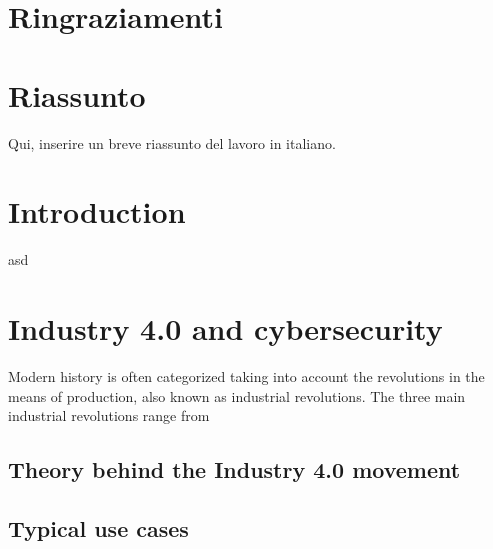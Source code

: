 \documentclass[a4paper, 12pt]{book}
\begin{document}
\pagestyle{empty}
\clearpage
\tableofcontents
\thispagestyle{empty}

\chapter{Ringraziamenti}


\chapter{Riassunto}

Qui, inserire un breve riassunto del lavoro in italiano.


\chapter{Introduction}
\pagestyle{fancy}
\fancyhf{}
\renewcommand{\headrulewidth}{2pt}
\fancyhead[EL]{\textbf{\textsf{\nouppercase\thepage}}}
\fancyhead[ER]{\textbf{\textsf{\nouppercase\leftmark}}}
\fancyhead[OR]{\textbf{\textsf{\nouppercase\thepage}}}
\fancyhead[OL]{\textbf{\textsf{\nouppercase {\rightmark}}}}

\thispagestyle{empty}

asd
\newpage

\chapter{Industry 4.0 and cybersecurity}
Modern history is often categorized taking into account the revolutions in the means of production, also known as industrial revolutions. The three main industrial revolutions range from 


\section{Theory behind the Industry 4.0 movement}
\section{Typical use cases}
\end{document}
